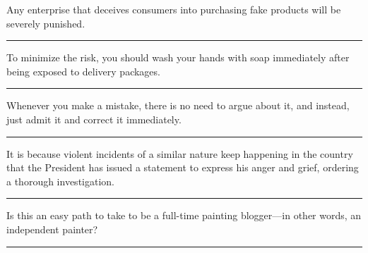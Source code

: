 \documentclass[11pt,a4paper]{article}
\newcommand{\num}[1]{\makebox[1.9em][r]{#1.}\hspace{0.3em}}
\newcommand{\wline}{\noindent\rule{\linewidth}{0.4pt}}
\begin{document}
\vspace{0.35em}\vspace{0.15em}

\begin{minipage}{\linewidth}

\num{29}Any enterprise that deceives consumers into purchasing fake products will be severely punished.

\vspace{0.25em}

\wline

\end{minipage}

\begin{minipage}{\linewidth}

\num{30}To minimize the risk, you should wash your hands with soap immediately after being exposed to delivery packages.

\vspace{0.25em}

\wline

\end{minipage}

\begin{minipage}{\linewidth}

\num{31}Whenever you make a mistake, there is no need to argue about it, and instead, just admit it and correct it immediately.

\vspace{0.25em}

\wline

\end{minipage}

\begin{minipage}{\linewidth}

\num{32}It is because violent incidents of a similar nature keep happening in the country that the President has issued a statement to express his anger and grief, ordering a thorough investigation.

\vspace{0.25em}

\wline

\end{minipage}

\vspace{0.35em}\vspace{0.15em}

\begin{minipage}{\linewidth}

\num{33}Is this an easy path to take to be a full-time painting blogger—in other words, an independent painter?

\vspace{0.25em}

\wline

\end{minipage}
\end{document}
